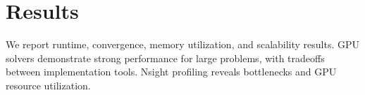 \section{Results}
We report runtime, convergence, memory utilization, and scalability results. GPU solvers demonstrate strong performance for large problems, with tradeoffs between implementation tools. Nsight profiling reveals bottlenecks and GPU resource utilization.